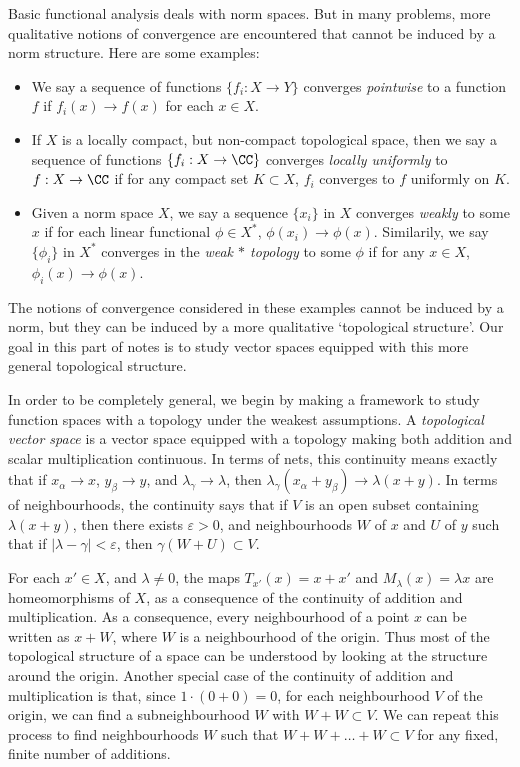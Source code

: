 Basic functional analysis deals with norm spaces. But in many problems, more qualitative notions of convergence are encountered that cannot be induced by a norm structure. Here are some examples:
%
\begin{itemize}
    \item We say a sequence of functions $\{ f_i: X \to Y \}$ converges \emph{pointwise} to a function $f$ if $f_i(x) \to f(x)$ for each $x \in X$.

    \item If $X$ is a locally compact, but non-compact topological space, then we say a sequence of functions $\{ f_i: X \to \CC \}$ converges \emph{locally uniformly} to $f: X \to \CC$ if for any compact set $K \subset X$, $f_i$ converges to $f$ uniformly on $K$.

    \item Given a norm space $X$, we say a sequence $\{ x_i \}$ in $X$ converges \emph{weakly} to some $x$ if for each linear functional $\phi \in X^*$, $\phi(x_i) \to \phi(x)$. Similarily, we say $\{ \phi_i \}$ in $X^*$ converges in the \emph{weak $*$ topology} to some $\phi$ if for any $x \in X$, $\phi_i(x) \to \phi(x)$.
\end{itemize}
%
The notions of convergence considered in these examples cannot be induced by a norm, but they can be induced by a more qualitative `topological structure'. Our goal in this part of notes is to study vector spaces equipped with this more general topological structure.

In order to be completely general, we begin by making a framework to study function spaces with a topology under the weakest assumptions. A \emph{topological vector space} is a vector space equipped with a topology making both addition and scalar multiplication continuous. In terms of nets, this continuity means exactly that if $x_\alpha \to x$, $y_\beta \to y$, and $\lambda_\gamma \to \lambda$, then $\lambda_\gamma (x_\alpha + y_\beta) \to \lambda (x + y)$. In terms of neighbourhoods, the continuity says that if $V$ is an open subset containing $\lambda(x + y)$, then there exists $\varepsilon > 0$, and neighbourhoods $W$ of $x$ and $U$ of $y$ such that if $|\lambda - \gamma| < \varepsilon$, then $\gamma(W + U) \subset V$.

For each $x' \in X$, and $\lambda \neq 0$, the maps $T_{x'}(x) = x + x'$ and $M_\lambda(x) = \lambda x$ are homeomorphisms of $X$, as a consequence of the continuity of addition and multiplication. As a consequence, every neighbourhood of a point $x$ can be written as $x + W$, where $W$ is a neighbourhood of the origin. Thus most of the topological structure of a space can be understood by looking at the structure around the origin. Another special case of the continuity of addition and multiplication is that, since $1 \cdot (0 + 0) = 0$, for each neighbourhood $V$ of the origin, we can find a subneighbourhood $W$ with $W + W \subset V$. We can repeat this process to find neighbourhoods $W$ such that $W + W + \dots + W \subset V$ for any fixed, finite number of additions.

